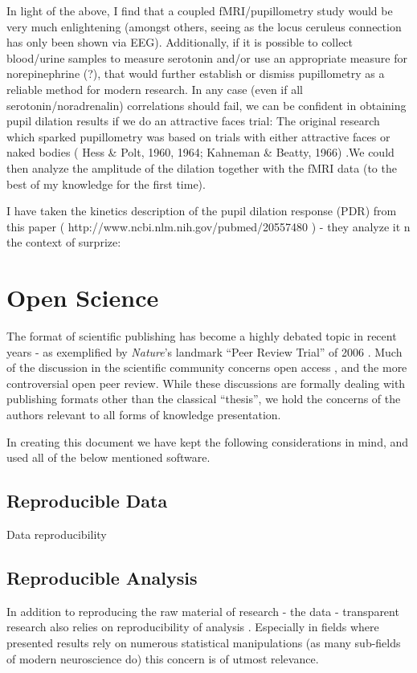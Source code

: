 	In light of the above, I find that a coupled fMRI/pupillometry study would be very much enlightening (amongst others, seeing as the locus ceruleus connection has only been shown via EEG). Additionally, if it is possible to collect blood/urine samples to measure serotonin and/or use an appropriate measure for norepinephrine (?), that would further establish or dismiss pupillometry as a reliable method for modern research. In any case (even if all serotonin/noradrenalin) correlations should fail, we can be confident in obtaining pupil dilation results if we do an attractive faces trial: The original research which sparked pupillometry was based on trials with either attractive faces or naked bodies ( Hess & Polt, 1960, 1964; Kahneman & Beatty, 1966) .We could  then analyze the amplitude of the dilation together with the fMRI data (to the best of my knowledge for the first time).

	I have taken the kinetics description of the pupil dilation response (PDR) from this paper ( http://www.ncbi.nlm.nih.gov/pubmed/20557480 ) - they analyze it n the context of surprize:
	\fi
    \section{Open Science}\label{sec:b_os}
	The format of scientific publishing has become a highly debated topic in recent years - as exemplified by \textit{Nature}'s landmark “Peer Review Trial” of 2006 \cite{Nature-debate2006}.
	Much of the discussion in the scientific community concerns open access \cite{VanNoorden2013,Parker2013}, and the more controversial open peer review.
	While these discussions are formally dealing with publishing formats other than the classical “thesis”, we hold the concerns of the authors relevant to all forms of knowledge presentation.
	
	In creating this document we have kept the following considerations in mind, and used all of the below mentioned software.
	\subsection{Reproducible Data}\label{sec:b_rr}
	    Data reproducibility 
	\subsection{Reproducible Analysis}\label{sec:b_ra}
	    In addition to reproducing the raw material of research - the data - transparent research also relies on reproducibility of analysis \cite{Peng2009}.
	    Especially in fields where presented results rely on numerous statistical manipulations (as many sub-fields of modern neuroscience do) this concern is of utmost relevance.
	    	    
